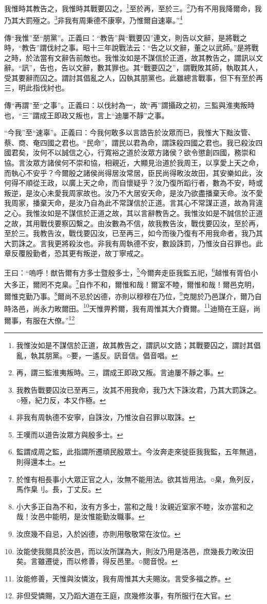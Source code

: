 我惟時其教告之，我惟時其戰要囚之，\footnote{我惟汝如是不謀信於正道，故其教告之，謂訊以文誥；其戰要囚之，謂討其倡亂，執其朋黨。○要，一遙反。訊音信。倡音唱。}至於再，至於三。\footnote{再，謂三監淮夷叛時。三，謂成王即政又叛。言迪屢不靜之事。}乃有不用我降爾命，我乃其大罰殛之。\footnote{我教告戰要囚汝已至再三，汝其不用我命，我乃大下誅汝君，乃其大罰誅之。○殛，紀力反，本又作極。}非我有周秉德不康寧，乃惟爾自速辜。”\footnote{非我有周執德不安寧，自誅汝，乃惟汝自召罪以取誅。}

{\noindent\zhuan{}\fzbyks 傳“我惟”至“朋黨”。正義曰：“教告”與“戰要囚”連文，則告以文辭，是將戰之時，“教告”謂伐紂之事。昭十三年說戰法云：“告之以文辭，董之以武師。”是將戰之時，於法當有文辭告前敵也。我惟汝如是不謀信於正道，故其教告之，謂訊以文辭。“訊”，告也，告以文辭，數其罪也。其“戰要囚之”，謂戰敗其師，執取其人，受其要辭而囚之。謂討其倡亂之人，囚執其朋黨也。此雖總言戰事，但下有至於再三，明此指伐紂也。 \par}

{\noindent\zhuan{}\fzbyks 傳“再謂”至“之事”。正義曰：以伐紂為一，故“再”謂攝政之初，三監與淮夷叛時也，“三”謂成王即政又叛也，言上“迪屢不靜”之事。 \par}

{\noindent\shu{}\fzkt “今我”至“速辜”。正義曰：今我何敢多以言誥告於汝眾而已，我惟大下黜汝管、蔡、商、奄四國之君也。“民命”，謂民以君為命，謂誅殺四國之君也。我已殺汝四國君矣，汝何不以誠信之心，行寬裕之道於汝眾方諸侯？欲令懲創四國，務崇和協。言汝眾方諸侯何不崇和協，相親近，大顯見治道於我周王，以享愛上天之命，而執心不安乎？今爾殷之諸侯尚得居汝常居，臣民尚得畋汝故田，其安樂如此，汝何得不順從王政，以廣上天之命，而自懷疑乎？汝乃復所蹈行者，數為不安，時或叛逆，是汝心未愛我周家故也。汝乃不大居安天命，是汝乃欲盡播棄天命。汝不愛我周家，播棄天命，是汝乃自為此不常謀信於正道。言其心不常謀正道，故為背違之心。我惟汝如是不謀信於正道之故，其以言辭教告之。我惟汝如是不誠信於正道之故，其用戰伐要察囚繫之。由汝數為不信，故我教告汝，戰伐要囚汝，至於再，至於三。我教告汝，戰伐要囚汝，已至再三，如今而後乃復有不用我命者，我乃其大罰誅之。言我更將殺汝也。非我有周執德不安，數設誅罰，乃惟汝自召罪也。此章反覆殷勤者，恐其更有叛逆，故丁寧戒之。 \par}

王曰：“嗚呼！猷告爾有方多士暨殷多士，\footnote{王嘆而以道告汝眾方與殷多士。}今爾奔走臣我監五祀，\footnote{監謂成周之監，此指謂所遷頑民殷眾士。今汝奔走來徙臣我我監，五年無過，則得還本土。}越惟有胥伯小大多正，爾罔不克臬。\footnote{於惟有相長事小大眾正官之人，汝無不能用法。欲其皆用法。○臬，魚列反，馬作臬刂。長，丁丈反。}自作不和，爾惟和哉！爾室不睦，爾惟和哉！爾邑克明，爾惟克勤乃事。\footnote{小大多正自為不和，汝有方多士，當和之哉！汝親近室家不睦，汝亦當和之哉！汝邑中能明，是汝惟能勤汝職事。}爾尚不忌於凶德，亦則以穆穆在乃位，\footnote{汝庶幾不自忌，入於凶德，亦則用敬敬常在汝位。}克閱於乃邑謀介，爾乃自時洛邑，尚永力畋爾田。\footnote{汝能使我閱具於汝邑，而以汝所謀為大，則汝乃用是洛邑，庶幾長力畋汝田矣。言雖遷徙，而以修善，得反邑里。○閱音悅。}天惟畀矜爾，我有周惟其大介賚爾。\footnote{汝能修善，天惟與汝憐汝，我有周惟其大夫賜汝。言受多福之胙。}迪簡在王庭，尚爾事，有服在大僚。”\footnote{非但受憐賜，又乃蹈大道在王庭，庶幾修汝事，有所服行在大官。}


